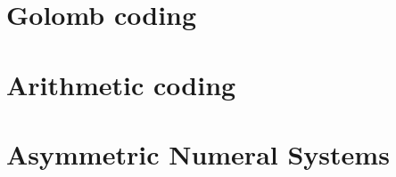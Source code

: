 \section{Golomb coding} \label{golomb-coding}

\section{Arithmetic coding}

\section{Asymmetric Numeral Systems}

